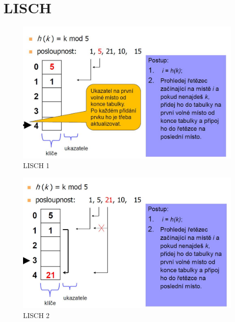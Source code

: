 \documentclass{book}
\begin{document}
\section{LISCH}

\begin{figure}[h]
\begin{center}
\includegraphics[width=12cm]{LISCH1.jpg}
\caption{LISCH 1}
\label{fig:lisch1}
\end{center}
\end{figure}

\begin{figure}[h]
\begin{center}
\includegraphics[width=12cm]{LISCH2.jpg}
\caption{LISCH 2}
\label{fig:lisch2}
\end{center}
\end{figure}
\end{document}

